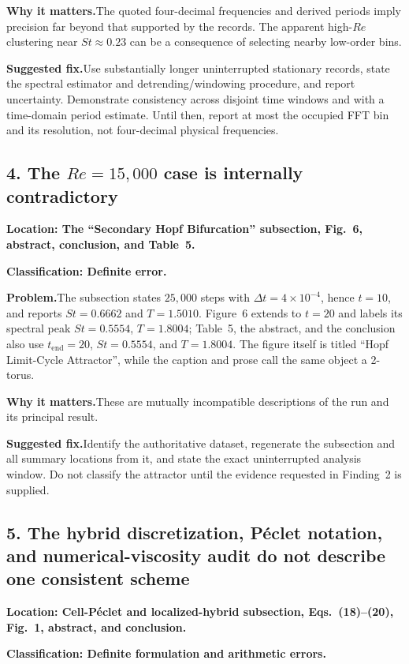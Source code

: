 \documentclass[11pt]{article}
\newcommand{\classification}[1]{\par\noindent\textbf{Classification: #1.}\par}
\newcommand{\location}[1]{\textbf{Location: #1}}
\newcommand{\problem}{\noindent\textbf{Problem.}\hspace{0.35em}}
\newcommand{\importance}{\par\noindent\textbf{Why it matters.}\hspace{0.35em}}
\newcommand{\fix}{\par\noindent\textbf{Suggested fix.}\hspace{0.35em}}
\begin{document}
\importance The quoted four-decimal frequencies and derived periods imply precision far beyond that supported by the records.  The apparent high-$Re$ clustering near $St\approx0.23$ can be a consequence of selecting nearby low-order bins.

\fix Use substantially longer uninterrupted stationary records, state the spectral estimator and detrending/windowing procedure, and report uncertainty.  Demonstrate consistency across disjoint time windows and with a time-domain period estimate.  Until then, report at most the occupied FFT bin and its resolution, not four-decimal physical frequencies.

\subsection*{4. The $Re=15{,}000$ case is internally contradictory}

\location{The ``Secondary Hopf Bifurcation'' subsection, Fig.~6, abstract, conclusion, and Table~5.}

\classification{Definite error}

\problem The subsection states $25{,}000$ steps with $\Delta t=4\times10^{-4}$, hence $t=10$, and reports $St=0.6662$ and $T=1.5010$.  Figure~6 extends to $t=20$ and labels its spectral peak $St=0.5554$, $T=1.8004$; Table~5, the abstract, and the conclusion also use $t_{\mathrm{end}}=20$, $St=0.5554$, and $T=1.8004$.  The figure itself is titled ``Hopf Limit-Cycle Attractor'', while the caption and prose call the same object a 2-torus.

\importance These are mutually incompatible descriptions of the run and its principal result.

\fix Identify the authoritative dataset, regenerate the subsection and all summary locations from it, and state the exact uninterrupted analysis window.  Do not classify the attractor until the evidence requested in Finding~2 is supplied.

\subsection*{5. The hybrid discretization, P\'eclet notation, and numerical-viscosity audit do not describe one consistent scheme}

\location{Cell-P\'eclet and localized-hybrid subsection, Eqs.~(18)--(20), Fig.~1, abstract, and conclusion.}

\classification{Definite formulation and arithmetic errors}
\end{document}
